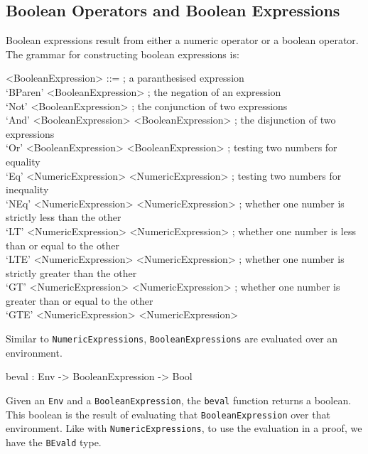     \subsection{Boolean Operators and Boolean Expressions}
        Boolean expressions result from either a numeric operator or a boolean operator. The grammar for constructing boolean expressions is:
        \setlength{\grammarindent}{11em}
        \begin{grammar}
            <BooleanExpression>
            ::=  ; a paranthesised expression\\
            `BParen' <BooleanExpression>
            \alt ; the negation of an expression\\
            `Not' <BooleanExpression>
            \alt ; the conjunction of two expressions\\
            `And' <BooleanExpression> <BooleanExpression>
            \alt ; the disjunction of two expressions\\
            `Or' <BooleanExpression> <BooleanExpression>
            \alt ; testing two numbers for equality\\
            `Eq' <NumericExpression> <NumericExpression>
            \alt ; testing two numbers for inequality\\
            `NEq' <NumericExpression> <NumericExpression>
            \alt ; whether one number is strictly less than the other\\
            `LT' <NumericExpression> <NumericExpression>
            \alt ; whether one number is less than or equal to the other\\
            `LTE' <NumericExpression> <NumericExpression>
            \alt ; whether one number is strictly greater than the other\\
            `GT' <NumericExpression> <NumericExpression>
            \alt ; whether one number is greater than or equal to the other\\
            `GTE' <NumericExpression> <NumericExpression>
        \end{grammar}
        Similar to \texttt{NumericExpressions}, \texttt{BooleanExpressions} are evaluated over an environment.
        
        \begin{code}[caption={The type of the \texttt{beval} function}]
            beval : Env -> BooleanExpression -> Bool
        \end{code}
    
        Given an \texttt{Env} and a \texttt{BooleanExpression}, the \texttt{beval} function returns a boolean. This boolean is the result of evaluating that \texttt{BooleanExpression} over that environment. Like with \texttt{NumericExpressions}, to use the evaluation in a proof, we have the \texttt{BEvald} type.
        

